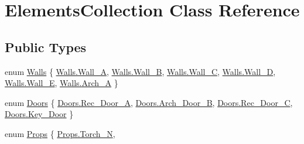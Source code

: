 \hypertarget{class_elements_collection}{}\section{Elements\+Collection Class Reference}
\label{class_elements_collection}
\subsection*{Public Types}
\begin{DoxyCompactItemize}
\item 
enum \mbox{\hyperlink{class_elements_collection_ab13b688210e7e8a238d0fcda6c22ee59}{Walls}} \{ \newline
\mbox{\hyperlink{class_elements_collection_ab13b688210e7e8a238d0fcda6c22ee59ac7954a4dd1748199929623b49c11d89a}{Walls.\+Wall\+\_\+A}}, 
\mbox{\hyperlink{class_elements_collection_ab13b688210e7e8a238d0fcda6c22ee59a155a71f84905f72f3b7e16072874458d}{Walls.\+Wall\+\_\+B}}, 
\mbox{\hyperlink{class_elements_collection_ab13b688210e7e8a238d0fcda6c22ee59a21703474d94381b6576ca88891be895d}{Walls.\+Wall\+\_\+C}}, 
\mbox{\hyperlink{class_elements_collection_ab13b688210e7e8a238d0fcda6c22ee59aab850ac97129f1feb8e4e15511f9564e}{Walls.\+Wall\+\_\+D}}, 
\newline
\mbox{\hyperlink{class_elements_collection_ab13b688210e7e8a238d0fcda6c22ee59a38bfc6af93f3036c7aa14d0b09e70cf4}{Walls.\+Wall\+\_\+E}}, 
\mbox{\hyperlink{class_elements_collection_ab13b688210e7e8a238d0fcda6c22ee59ac9f2b0c2c92173eb23e352b8d6f2f056}{Walls.\+Arch\+\_\+A}}
 \}
\item 
enum \mbox{\hyperlink{class_elements_collection_a21917dc4f24ee93da7275d2fd256d0ff}{Doors}} \{ \mbox{\hyperlink{class_elements_collection_a21917dc4f24ee93da7275d2fd256d0ffa401bf297a8513cfbda804cf21c8b5896}{Doors.\+Rec\+\_\+\+Door\+\_\+A}}, 
\mbox{\hyperlink{class_elements_collection_a21917dc4f24ee93da7275d2fd256d0ffa4c9ecb25512124c2f5d95c8519bfcd4f}{Doors.\+Arch\+\_\+\+Door\+\_\+B}}, 
\mbox{\hyperlink{class_elements_collection_a21917dc4f24ee93da7275d2fd256d0ffade87e4be4ee3e6b0ef70429d6b14a822}{Doors.\+Rec\+\_\+\+Door\+\_\+C}}, 
\mbox{\hyperlink{class_elements_collection_a21917dc4f24ee93da7275d2fd256d0ffae6a8d40e4da169fb0269a343f21518d4}{Doors.\+Key\+\_\+\+Door}}
 \}
\item 
enum \mbox{\hyperlink{class_elements_collection_ac2ee575d2d4b1175b1b36ff3a9080e18}{Props}} \{ \newline
\mbox{\hyperlink{class_elements_collection_ac2ee575d2d4b1175b1b36ff3a9080e18a474fd54d1bee41a4913011ea666374dc}{Props.\+Torch\+\_\+N}}, 

\end{DoxyCompactItemize}
